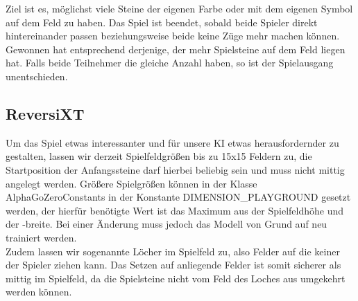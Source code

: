 Ziel ist es, m\"{o}glichst viele Steine der eigenen Farbe oder mit dem eigenen Symbol auf dem Feld zu haben. Das Spiel ist beendet, sobald beide Spieler direkt hintereinander passen beziehungsweise beide keine Z\"{u}ge mehr machen k\"{o}nnen. Gewonnen hat entsprechend derjenige, der mehr Spielsteine auf dem Feld liegen hat. Falls beide Teilnehmer die gleiche Anzahl haben, so ist der Spielausgang unentschieden.

\subsection{ReversiXT}
Um das Spiel etwas interessanter und f\"{u}r unsere KI etwas herausfordernder zu gestalten, lassen wir derzeit Spielfeldgr\"{o}\ss en bis zu 15x15 Feldern zu, die Startposition der Anfangssteine darf hierbei beliebig sein und muss nicht mittig angelegt werden. Gr\"{o}\ss ere Spielgr\"{o}\ss en k\"{o}nnen in der Klasse AlphaGoZeroConstants in der Konstante \glqq DIMENSION\_PLAYGROUND\grqq{} gesetzt werden, der hierf\"{u}r ben\"{o}tigte Wert ist das Maximum aus der Spielfeldh\"{o}he und der -breite. Bei einer \"{A}nderung muss jedoch das Modell von Grund auf neu trainiert werden.\\
Zudem lassen wir sogenannte L\"{o}cher im Spielfeld zu, also Felder auf die keiner der Spieler ziehen kann. Das Setzen auf anliegende Felder ist somit sicherer als mittig im Spielfeld, da die Spielsteine nicht vom Feld des Loches aus umgekehrt werden k\"{o}nnen.